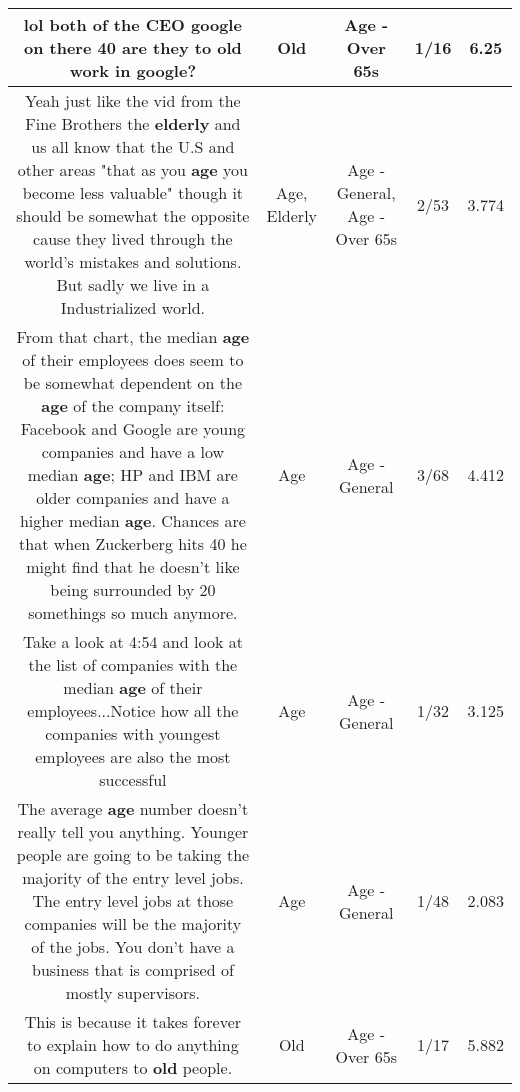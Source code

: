 \documentclass[11pt]{article}
\newlength\mylength
\begin{document}
\begin{center}
\begin{longtable}{|C{.65\mylength}|C{.30\mylength}|C{.12\mylength}|C{.12\mylength}|C{.12\mylength}|}
  \small lol both of the  CEO google on there 40 are they to \textbf{old} work in google?\normalsize   & Old & Age - Over 65s & 1/16 & 6.25 \\  \hline
  \small Yeah just like the vid from the Fine Brothers the \textbf{elderly} and us all know that the U.S and other areas "that as you \textbf{age} you become less valuable" though it should be somewhat the opposite cause they lived through the world's mistakes and solutions. But sadly we live in a Industrialized world.\normalsize   & Age, Elderly & Age - General, Age - Over 65s & 2/53 & 3.774 \\  \hline
  \small From that chart, the median \textbf{age} of their employees does seem to be somewhat dependent on the \textbf{age} of the company itself: Facebook and Google are young companies and have a low median \textbf{age}; HP and IBM are older companies and have a higher median \textbf{age}. Chances are that when Zuckerberg hits 40 he might find that he doesn't like being surrounded by 20 somethings so much anymore.\normalsize   & Age & Age - General & 3/68 & 4.412 \\  \hline
  \small Take a look at 4:54 and look at the list of companies with the median \textbf{age} of their employees...Notice how all the companies with youngest employees are also the most successful\normalsize   & Age & Age - General & 1/32 & 3.125 \\  \hline
  \small The average \textbf{age} number doesn't really tell you anything. Younger people are going to be taking the majority of the entry level jobs. The entry level jobs at those companies will be the majority of the jobs. You don't have a business that is comprised of mostly supervisors.\normalsize   & Age & Age - General & 1/48 & 2.083 \\  \hline
  \small This is because it takes forever to explain how to do anything on computers to \textbf{old} people.\normalsize   & Old & Age - Over 65s & 1/17 & 5.882 \\  \hline

\end{longtable}
\end{center}
\end{document}

